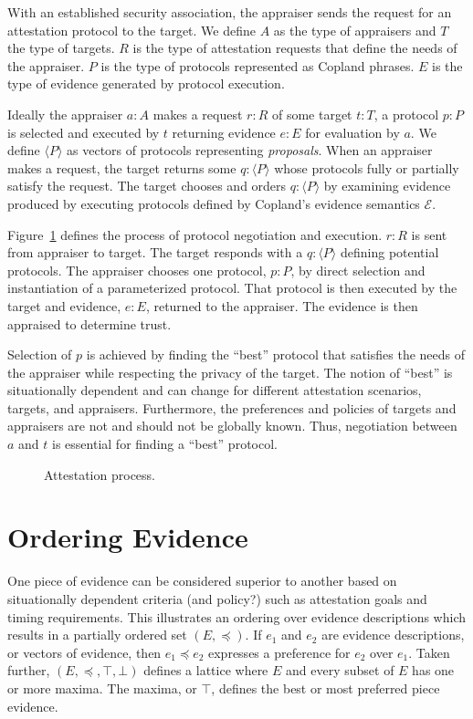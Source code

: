 \documentclass[sigconf,authordraft]{acmart}
\begin{document}
With an established security association, the appraiser sends the request for an attestation protocol to the target.  We
define $A$ as the type of appraisers and $T$ the type of targets.  $R$
is the type of attestation requests that define the needs of the
appraiser.  $P$ is the type of protocols represented as Copland
phrases.  $E$ is the type of evidence generated by protocol execution.

Ideally the appraiser $a:A$ makes a request $r:R$ of some target
$t:T$, a protocol $p:P$ is selected and executed by $t$ returning
evidence $e:E$ for evaluation by $a$. We define $\langle P \rangle$ as
vectors of protocols representing \emph{proposals}.  When an appraiser
makes a request, the target returns some $q:\langle P \rangle$ whose
protocols fully or partially satisfy the request. The target chooses
and orders $q:\langle P\rangle$ by examining evidence produced by
executing protocols defined by Copland's evidence semantics
$\mathcal{E}$.

Figure~\ref{fig:sequence-fig} defines the process of protocol
negotiation and execution.  $r:R$ is sent from appraiser to target.
The target responds with a $q:\langle P\rangle$ defining potential
protocols.  The appraiser chooses one protocol, $p:P$, by direct
selection and instantiation of a parameterized protocol.  That
protocol is then executed by the target and evidence, $e:E$, returned
to the appraiser.  The evidence is then appraised to determine trust.

Selection of $p$ is achieved by finding the ``best'' protocol that
satisfies the needs of the appraiser while respecting the privacy of
the target. The notion of ``best'' is situationally dependent and can
change for different attestation scenarios, targets, and appraisers.
Furthermore, the preferences and policies of targets and appraisers
are not and should not be globally known.  Thus, negotiation between
$a$ and $t$ is essential for finding a ``best'' protocol.

\begin{figure}[hbtp]
  \centering 
  \caption[Attestation process]{Attestation process.}
  \label{fig:sequence-fig}
\end{figure}

\section{Ordering Evidence}

One piece of evidence can be considered superior to another based on situationally dependent criteria (and policy?) such as attestation goals and timing requirements. This illustrates an ordering over evidence descriptions which results in a partially ordered set $(E,\preceq)$. If $e_1$ and $e_2$ are evidence descriptions, or vectors of evidence, then $e_1\preceq e_2$ expresses a preference for $e_2$ over $e_1$. Taken further, $(E,\preceq,\top,\bot)$ defines a lattice where $E$ and every subset of $E$ has one or more maxima.  The maxima, or $\top$, defines the best or most preferred piece evidence.
\end{document}
